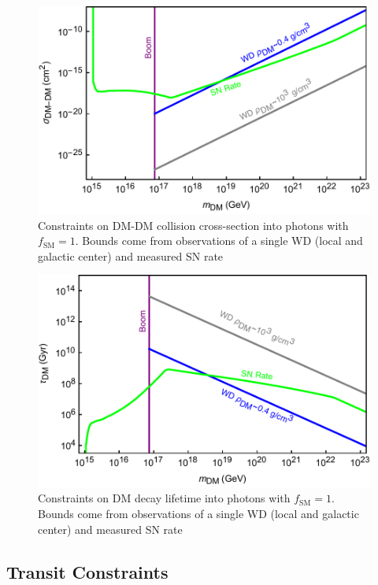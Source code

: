 \documentclass[twocolumn,preprintnumbers,amsmath,amssymb,prl, superscriptaddress]{revtex4}
\begin{document}
\begin{figure}
\includegraphics[scale=.45]{collisionobservation.pdf}
\caption{Constraints on DM-DM collision cross-section into photons with $f_\text{SM} =1$. Bounds come from observations of a single WD (local and galactic center) and measured SN rate}
\label{fig:collisionclasses}
\end{figure}

\begin{figure}
\includegraphics[scale=.45]{decayobservation.pdf}
\caption{Constraints on DM decay lifetime into photons with $f_\text{SM} =1$. Bounds come from observations of a single WD (local and galactic center) and measured SN rate}
\label{fig:decayclasses}
\end{figure}

\subsection{Transit Constraints}
\label{sec:TransitConstraints}
\end{document}

